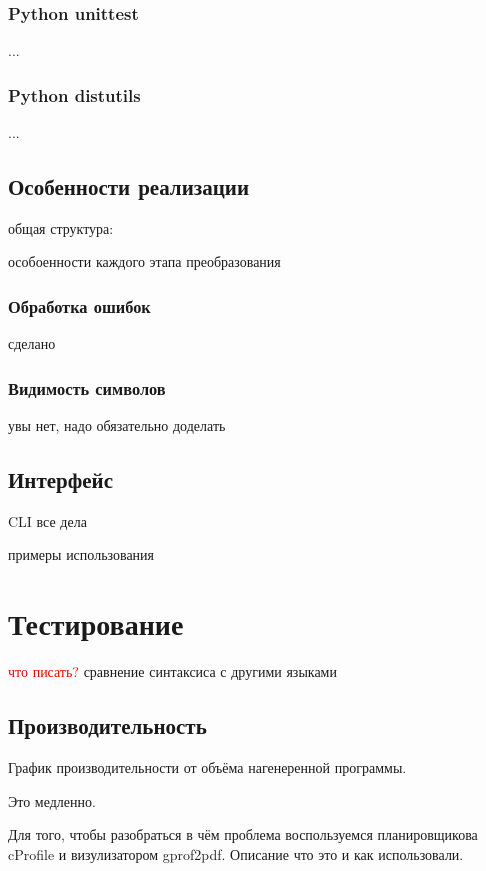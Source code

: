 \documentclass[12pt,a4paper,oneside]{extarticle}
\begin{document}
        \subsubsection{Python unittest}
            ...
        \subsubsection{Python distutils}
            ...

    \subsection{Особенности реализации}
        общая структура:


        особоенности каждого этапа преобразования
        \subsubsection{Обработка ошибок}
            сделано
        \subsubsection{Видимость символов}
            увы нет, надо обязательно доделать
        
    \subsection{Интерфейс}
        CLI все дела

        примеры использования

        

\clearpage

\section{Тестирование}
    \textcolor{red}{что писать?}
    сравнение синтаксиса с другими языками

    \subsection{Производительность}
        График производительности от объёма нагенеренной программы.

        Это медленно.

        Для того, чтобы разобраться в чём проблема воспользуемся планировщикова cProfile и визулизатором gprof2pdf. 
        Описание что это и как использовали.
\end{document}
